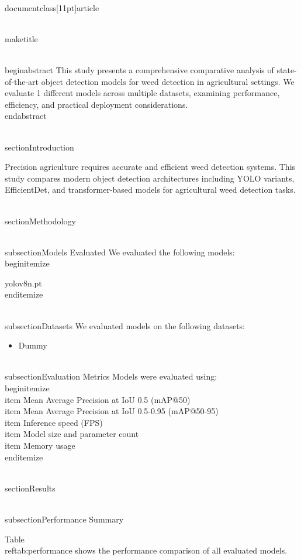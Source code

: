 \\documentclass[11pt]{article}
\begin{document}
\\maketitle

\\begin{abstract}
This study presents a comprehensive comparative analysis of state-of-the-art object detection models for weed detection in agricultural settings. We evaluate 1 different models across multiple datasets, examining performance, efficiency, and practical deployment considerations.
\\end{abstract}

\\section{Introduction}

Precision agriculture requires accurate and efficient weed detection systems. This study compares modern object detection architectures including YOLO variants, EfficientDet, and transformer-based models for agricultural weed detection tasks.

\\section{Methodology}

\\subsection{Models Evaluated}
We evaluated the following models:
\\begin{itemize}
\item yolov8n.pt
\\end{itemize}

\\subsection{Datasets}
We evaluated models on the following datasets:
\begin{itemize}
\item Dummy
\end{itemize}

\\subsection{Evaluation Metrics}
Models were evaluated using:
\\begin{itemize}
\\item Mean Average Precision at IoU 0.5 (mAP@50)
\\item Mean Average Precision at IoU 0.5-0.95 (mAP@50-95)
\\item Inference speed (FPS)
\\item Model size and parameter count
\\item Memory usage
\\end{itemize}

\\section{Results}

\\subsection{Performance Summary}

Table~\\ref{tab:performance} shows the performance comparison of all evaluated models.
\end{document}
